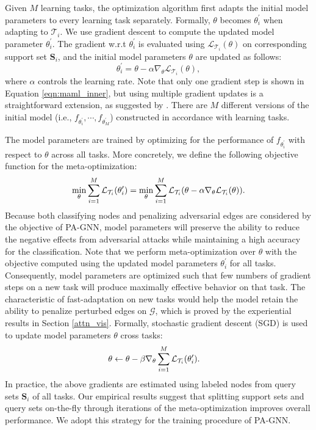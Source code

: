 \documentclass[sigconf]{acmart}
\newcommand{\ours}{{PA-GNN}\xspace}
\def \G {\mathcal{G}}
\def \L {\mathcal{L}}
\def \T {\mathcal{T}}
\def \S {\mathbf{S}}
\begin{document}
Given $M$ learning tasks, the optimization algorithm first adapts the initial model parameters to every learning task separately. 
Formally, $\theta$ becomes $\theta^\prime_{i}$ when adapting to $\T_i$. We use gradient descent to compute the updated model parameter $\theta^\prime_{i}$. The gradient w.r.t $\theta^\prime_{i}$ is evaluated using  $\L_{\T_i}(\theta)$ on corresponding support set $\S_i$, and the initial model parameters $\theta$ are updated as follows:
\begin{equation} \label{eqn:maml_inner}
    \theta^\prime_{i} = \theta - \alpha \nabla_\theta \L_{\T_i}(\theta),
\end{equation}
where $\alpha$ controls the learning rate. 
Note that only one gradient step is shown in Equation \ref{eqn:maml_inner}, but using multiple gradient updates is a straightforward extension, as suggested by \cite{finn2017model}. 
There are $M$ different versions of the initial model (i.e., $f_{\theta_i^\prime},\cdots, f_{\theta_M^\prime}$) constructed in accordance with learning tasks.

The model parameters are trained by optimizing for the performance of $f_{\theta_i^\prime}$ with respect to $\theta$ across all tasks.
More concretely, we define the following objective function for the meta-optimization:
\begin{equation} \small
    \min_{\theta} \sum_{i=1}^M \L_{\T_i}({\theta^\prime_{i}})
    = \min_{\theta} \sum_{i=1}^M \L_{\T_i}({\theta - \alpha \nabla_\theta \L_{\T_i}(\theta)}).
\end{equation}
Because both classifying nodes and penalizing adversarial edges are considered by the objective of \ours, model parameters will preserve the ability to reduce the negative effects from adversarial attacks while maintaining a high accuracy for the classification.
Note that we perform meta-optimization over $\theta$ with the objective computed using the updated model parameters $\theta^\prime_{i}$ for all tasks.
Consequently, model parameters are optimized such that few numbers of gradient steps on a new task will produce maximally effective behavior on that task.
The characteristic of fast-adaptation on new tasks would help the model retain the ability to penalize perturbed edges on $\G$, which is proved by the experiential results in Section \ref{attn_vis}.
Formally, stochastic gradient descent (SGD) is used to update model parameters $\theta$ cross tasks:
\begin{align} \small
    \theta  & \leftarrow \theta - \beta \nabla_\theta \sum_{i=1}^{M} \L_{\T_i}({\theta_{i}^\prime}).
\end{align}
In practice, the above gradients are estimated using labeled nodes from query sets $\S_i$ of all tasks. Our empirical results suggest that splitting support sets and query sets on-the-fly through iterations of the meta-optimization improves overall performance. We adopt this strategy for the training procedure of \ours.
\end{document}
